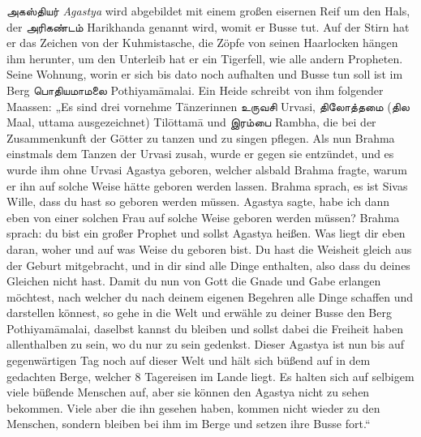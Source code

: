 \documentclass{article}
\newcommand{\TamilText}[1]{\texttamil{#1}}
\newcommand{\tam}[1]{\TamilText{#1}}
\begin{document}
\tam{அகஸ்தியர்} \emph{Agastya} wird abgebildet mit einem großen eisernen Reif um den Hals, der \tam{அரிகண்டம்} Harikhanda genannt wird, womit er Busse tut. Auf der Stirn hat er das Zeichen von der Kuhmistasche, die Zöpfe von seinen Haarlocken hängen ihm herunter, um den Unterleib hat er ein Tigerfell, wie alle andern Propheten. Seine Wohnung, worin er sich bis dato noch aufhalten und Busse tun soll ist im Berg \tam{பொதியமாமலை} Pothiyam\={a}malai. Ein Heide schreibt von ihm folgender Maassen: „Es sind drei vornehme Tänzerinnen \tam{உருவசி} Urvasi, \tam{திலோத்தமை} (\tam{தில} Maal, uttama ausgezeichnet) Til\={o}ttam\={a} und \tam{இரம்பை} Rambha, die bei der Zusammenkunft der Götter zu tanzen und zu singen pflegen. Als nun Brahma einstmals dem Tanzen der Urvasi zusah, wurde er gegen sie entzündet, und es wurde ihm ohne Urvasi Agastya geboren, welcher alsbald Brahma fragte, warum er ihn auf solche Weise hätte geboren werden lassen. Brahma sprach, es ist Sivas Wille, dass du hast so geboren werden müssen. Agastya sagte, habe ich dann eben von einer solchen Frau auf solche Weise geboren werden müssen? Brahma sprach: du bist ein großer Prophet und sollst Agastya heißen. Was liegt dir eben daran, woher und auf was Weise du geboren bist. Du hast die Weisheit gleich aus der Geburt mitgebracht, und in dir sind alle Dinge enthalten, also dass du deines Gleichen nicht hast. Damit du nun von Gott die Gnade und Gabe erlangen möchtest, nach welcher du nach deinem eigenen Begehren alle Dinge schaffen und darstellen könnest, so gehe in die Welt und erwähle zu deiner Busse den Berg Pothiyam\={a}malai, daselbst kannst du bleiben und sollst dabei die Freiheit haben allenthalben zu sein, wo du nur zu sein gedenkst. Dieser Agastya ist nun bis auf gegenwärtigen Tag noch auf dieser Welt und hält sich büßend auf in dem gedachten Berge, welcher 8 Tagereisen im Lande liegt. Es halten sich auf selbigem viele büßende Menschen auf, aber sie können den Agastya nicht zu sehen bekommen. Viele aber die ihn gesehen haben, kommen nicht wieder zu den Menschen, sondern bleiben bei ihm im Berge und setzen ihre Busse fort.“
\end{document}
